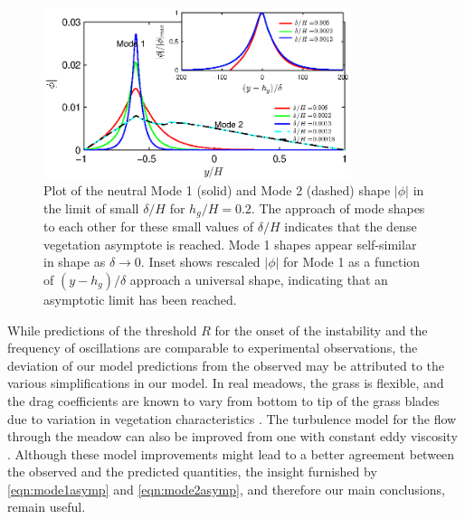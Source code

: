 \documentclass{jfm}
\newcommand{\hg}{h_g}
\renewcommand{\Rey}{{R}}
\newcommand{\Ndg}{\tilde{N}_g}
\begin{document}

\begin{figure}
\centerline{\includegraphics[width=9cm]{fig5}}
\caption{
Plot of the neutral Mode 1 (solid) and Mode 2 (dashed) shape $|\phi|$ in the limit of small $\delta/H$ for $\hg/H=0.2$. 
The approach of mode shapes to each other for these small values of $\delta/H$ indicates that the dense vegetation asymptote is reached. 
Mode 1 shapes appear self-similar in shape as $\delta\to 0$.
Inset shows rescaled $|\phi|$ for Mode 1 as a function of $(y-\hg)/\delta$ approach a universal shape, indicating that an asymptotic limit has been reached. 
}
\label{Asymptotic_mode}
\end{figure}
While predictions of the threshold $\Rey$ for the onset of the instability and the frequency of oscillations are comparable to experimental observations, the deviation of our model predictions from the observed may be attributed to the various simplifications in our model. 
In real meadows, the grass is flexible, and the drag coefficients are known to vary from bottom to tip of the grass blades due to variation in vegetation characteristics \citep{Vivoni98,Nepf00}. 
The turbulence model for the flow through the meadow can also be improved from one with constant eddy viscosity \citep{Ghisal02, Nepf04}. 
Although these model improvements might lead to a better agreement between the observed and the predicted quantities, the insight furnished by \eqref{eqn:mode1asymp} and \eqref{eqn:mode2asymp}, and therefore our main conclusions, remain useful.
\end{document}
